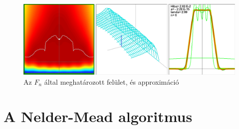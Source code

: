 \documentclass[oneside,titlepage,12pt,a4paper]{report}
\begin{document}
\begin{figure}[H]
\begin{center}
   \includegraphics[width=140mm]{./Abrak/Ereszkedo1/Er36.png}
  \caption{Az $F_n$ által meghatározott felület, és approximáció}
\end{center}
\end{figure}

\section{A Nelder-Mead algoritmus} \label{sec::neldermead}
\end{document}
